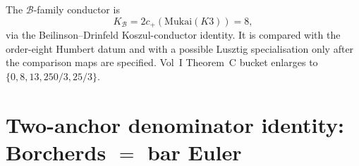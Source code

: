 \begin{remark}
\label{rem:k3e-cy3-mukai}
The $\mathcal B$-family conductor is
\[
K_{\mathcal B}=2c_+(\mathrm{Mukai}(K3))=8,
\]
via the Beilinson--Drinfeld Koszul-conductor identity. It is compared
with the order-eight Humbert datum and with a possible Lusztig
specialisation only after the comparison maps are specified. Vol~I
Theorem~C bucket enlarges to \(\{0,8,13,250/3,25/3\}\).
\end{remark}

\section{Two-anchor denominator identity: Borcherds \texorpdfstring{$=$}{=} bar Euler}
\label{sec:k3e-cy3-kappa-discipline}

